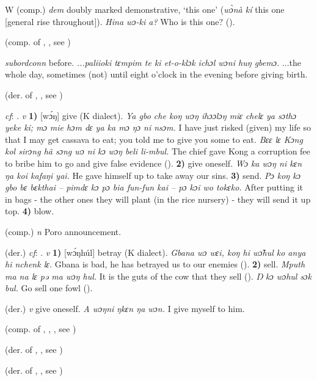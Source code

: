 \begin{letter}{W}
 (comp.) \textit{dem} doubly marked demonstrative, ‘this one' (\textit{wɔ̀nà kí} this one [general rise throughout]). \textit{Hina wɔ-ki a?} Who is this one? (\citealt{Pichl1967}). 

 (comp. of , , see ) 

 \textit{subordconn} before. \textit{...paliioki tɛmpim te ki et-o-klɔk ichɔl wɔni huŋ gbemɔ.} ...the whole day, sometimes (not) until eight o'clock in the evening before giving birth.

 (der. of , , see ) 

 \textit{cf}: . \textit{v} \textbf{1)} [wɔ́ŋ] give (K dialect). \textit{Ya gbo che koŋ wɔŋ ihɔɔlɔŋ miɛ chelɛ ya sɔthɔ yeke ki; mɔ mie hɔm dɛ ya ka mɔ ŋɔ ni nsɔm.} I have just risked (given) my life so that I may get cassava to eat; you told me to give you some to eat. \textit{Bɛɛ lɛ Kɔng kol sirɔng hã sɔng wɔ ni kɔ wɔŋ beli li-mbul.} The chief gave Kong a corruption fee to bribe him to go and give false evidence (\citealt{Pichl1967}). \textbf{2)} give oneself. \textit{Wɔ ka wɔŋ ni kɛn ŋa koi kafaŋi yai.} He gave himself up to take away our sins. \textbf{3)} send. \textit{Pɔ koŋ kɔ gbo bɛ bɛkthai – pimdɛ kɔ pɔ bia fun-fun kai – pɔ kɔi wo tokɛko.} After putting it in bags - the other ones they will plant (in the rice nursery) - they will send it up top. \textbf{4)} blow.

 (comp.) \textit{n} Poro announcement.

 (der.) \textit{cf}: . \textit{v} \textbf{1)} [wɔ́ŋhúl] betray (K dialect). \textit{Gbana wɔ wɛi, koŋ hi wɔ̃hul ko anya hi nchenk lɛ.} Gbana is bad, he has betrayed us to our enemies (\citealt{Pichl1967}). \textbf{2)} sell. \textit{Mputh ma na lɛ pə ma wɔŋ hul.} It is the guts of the cow that they sell (\citealt{Pichl1967}). \textit{Ŋ kɔ wɔhul sɔk bul.} Go sell one fowl (\citealt{Pichl1967}). 

 (der.) \textit{v} give oneself. \textit{A wɔŋni ŋkɛn ŋa wɔn.} I give myself to him.

 (comp. of , , , see ) 

 (der. of , , see ) 

 (der. of , , see ) 


\end{letter}
